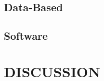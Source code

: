 \subsection{Data-Based}

\subsection{Software}



\section{\centering DISCUSSION}





\clearpage






